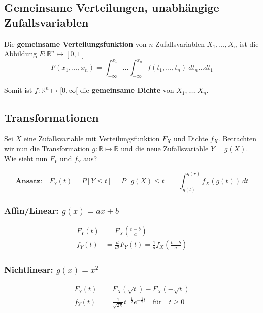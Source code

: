 \documentclass[11pt]{article}
\begin{document}
\subsection{Gemeinsame Verteilungen, unabh{\"a}ngige Zufallsvariablen}

Die \textbf{gemeinsame Verteilungsfunktion} von $n$ Zufallsvariablen $X_1,...,X_n$ ist die Abbildung $F: \mathbb{R}^n \mapsto [0,1]$
\begin{equation*}
	F(x_1,...,x_n) = \int_{-\infty}^{x_1} ... \int_{-\infty}^{x_n} f(t_1,...,t_n)\ dt_n...dt_1
\end{equation*}

Somit ist $f: \mathbb{R}^n \mapsto [0, \infty[$ die \textbf{gemeinsame Dichte} von $X_1,...,X_n$.

\subsection{Transformationen}

Sei $X$ eine Zufallsvariable mit Verteilungsfunktion $F_X$ und Dichte $f_X$. Betrachten wir nun die Transformation $g: \mathbb{R} \mapsto \mathbb{R}$ und die neue Zufallsvariable $Y = g(X)$. Wie sieht nun $F_Y$ und $f_Y$ aus?

\begin{equation*}
	\textbf{Ansatz:}\quad F_Y(t) = P[Y \leq t] = P[g(X) \leq t] = \int_{g(l)}^{g(r)} f_X(g(t))\ dt
\end{equation*}

\subsubsection{Affin/Linear: $g(x) = ax + b$}

\begin{equation*}
\begin{split}
	F_Y(t) & = F_X(\frac{t-b}{a}) \\
	f_Y(t) & = \frac{d}{dt} F_Y(t) = \frac{1}{a}f_X(\frac{t-b}{a})
\end{split}
\end{equation*}

\subsubsection{Nichtlinear: $g(x) = x^2$}

\begin{equation*}
\begin{split}
	F_Y(t) & = F_X(\sqrt{t}) - F_X(-\sqrt{t}) \\
	f_Y(t) & = \frac{1}{\sqrt{2\pi}}t^{-\frac{1}{2}}e^{-\frac{1}{2}t} \quad\text{f{\"u}r}\quad t \geq 0
\end{split}
\end{equation*}
\end{document}
